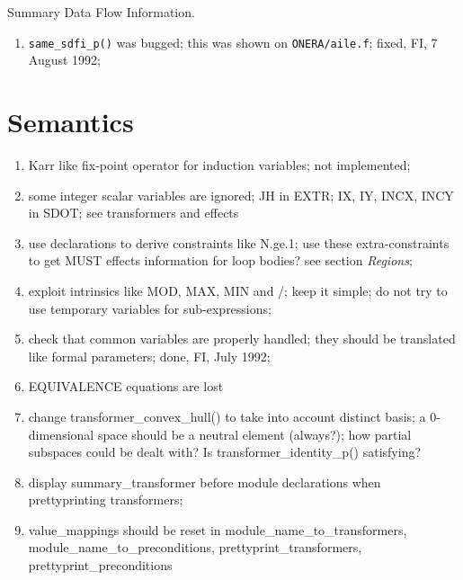 Summary Data Flow Information.

\begin{enumerate}

  \item \verb+same_sdfi_p()+ was bugged; this was shown on 
	\verb+ONERA/aile.f+; fixed, FI, 7 August 1992;

\end{enumerate}

\section{Semantics}

\begin{enumerate}

  \item Karr like fix-point operator for induction variables; not implemented;

  \item some integer scalar variables are ignored; JH in EXTR;
	IX, IY, INCX, INCY in SDOT; see transformers and effects

  \item use declarations to derive constraints like N.ge.1; use these
	extra-constraints to get MUST effects information for loop bodies?
	see section {\em Regions};

  \item exploit intrinsics like MOD, MAX, MIN and /; keep it simple;
	do not try to use temporary variables for sub-expressions;

  \item check that common variables are properly handled; they should
	be translated like formal parameters; done, FI, July 1992;

  \item EQUIVALENCE equations are lost

  \item change transformer\_convex\_hull() to take into account distinct
	basis; a 0-dimensional space should be a neutral element (always?); how
	partial subspaces could be dealt with? Is transformer\_identity\_p()
	satisfying?

  \item display summary\_transformer before module declarations when
	prettyprinting transformers;

  \item value\_mappings should be reset in module\_name\_to\_transformers,
	module\_name\_to\_preconditions, prettyprint\_transformers,
	prettyprint\_preconditions


\end{enumerate}
